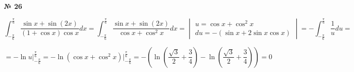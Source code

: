 \documentclass{article}
\begin{document}
\textbf{№ 26} 

$$ \int_{-\frac{\pi}{6}}^{\frac{\pi}{6}} \frac{\sin{x} + \sin{(2x)}}{(1+\cos{x})\cos{x}} dx 
= \int_{-\frac{\pi}{6}}^{\frac{\pi}{6}} \frac{\sin{x} + \sin{(2x)}}{\cos{x}+\cos^2{x}} dx 
= \begin{vmatrix} u = \cos{x}+\cos^2{x} \\
                 du = -(\sin{x}+2\sin{x}\cos{x}) \end{vmatrix} 
= -\int_{-\frac{\pi}{6}}^{\frac{\pi}{6}} \frac{1}{u}du
= $$

$$ = -\ln{u} \bigg\vert_{-\frac{\pi}{6}}^{\frac{\pi}{6}} 
= -\ln{(\cos{x}+\cos^2{x})} \bigg\vert_{-\frac{\pi}{6}}^{\frac{\pi}{6}}
= -\left( \ln{\left(\frac{\sqrt{3}}{2} + \frac{3}{4} \right)} - \ln{\left(\frac{\sqrt{3}}{2} + \frac{3}{4} \right)} \right) 
= 0 $$
\end{document}
